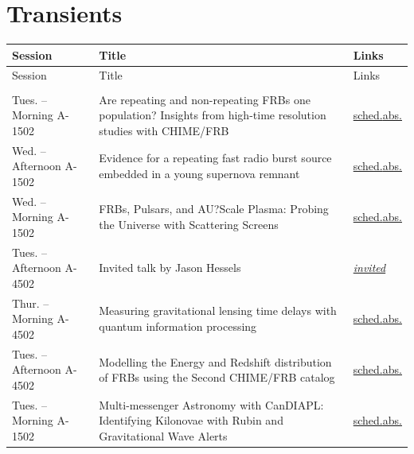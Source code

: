 \section*{Transients}
{\small
\setlength{\emergencystretch}{1em}
\begin{longtable}{@{}>{\TableRaggedRight\arraybackslash\hspace{0pt}}p{} >{\TableRaggedRight\arraybackslash\hspace{0pt}}p{} >{\TableRaggedRight\arraybackslash\hspace{0pt}}p{}@{}}
\toprule
Session & Title & Links \\
\midrule
\endfirsthead
\toprule
Session & Title & Links \\
\midrule
\endhead
\addlinespace[0.15em]
\multicolumn{3}{@{}l}{\sffamily\bfseries\color{cascateal} Talks} \\
\addlinespace[0.1em]
Tues. -- Morning A-1502 & Are repeating and non-repeating FRBs one population? Insights from high-time resolution studies with CHIME/FRB & \hyperlink{schedule-talk-134}{sched.}\newline \hyperlink{abstract-talk-134}{abs.} \\
Wed. -- Afternoon A-1502 & Evidence for a repeating fast radio burst source embedded in a young supernova remnant & \hyperlink{schedule-talk-52}{sched.}\newline \hyperlink{abstract-talk-52}{abs.} \\
Wed. -- Morning A-1502 & FRBs, Pulsars, and AU?Scale Plasma: Probing the Universe with Scattering Screens & \hyperlink{schedule-talk-164}{sched.}\newline \hyperlink{abstract-talk-164}{abs.} \\
Tues. -- Afternoon A-4502 & Invited talk by Jason Hessels & \hyperlink{invited-jason-hessels}{\textit{invited}} \\
Thur. -- Morning A-4502 & Measuring gravitational lensing time delays with quantum information processing & \hyperlink{schedule-talk-49}{sched.}\newline \hyperlink{abstract-talk-49}{abs.} \\
Tues. -- Afternoon A-4502 & Modelling the Energy and Redshift distribution of FRBs using the Second CHIME/FRB catalog & \hyperlink{schedule-talk-33}{sched.}\newline \hyperlink{abstract-talk-33}{abs.} \\
Tues. -- Morning A-1502 & Multi-messenger Astronomy with CanDIAPL: Identifying Kilonovae with Rubin and Gravitational Wave Alerts & \hyperlink{schedule-talk-140}{sched.}\newline \hyperlink{abstract-talk-140}{abs.} \\

\end{longtable}}
